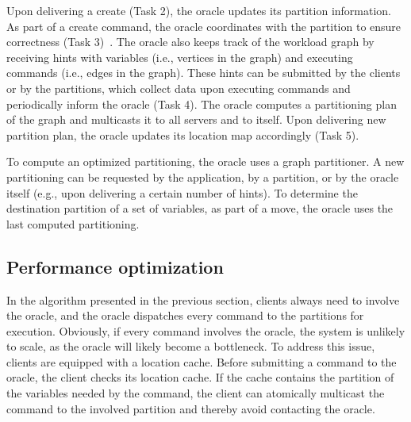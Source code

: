 Upon delivering a create (Task 2), the oracle updates its partition information.
As part of a create command, the oracle coordinates with the partition to ensure correctness (Task 3)~\cite{bezerra2014ssmr}.
%
The oracle also keeps track of the workload graph by receiving hints with variables (i.e., vertices in the graph) and executing commands (i.e., edges in the graph). These hints can be submitted by the clients or by the partitions, which collect data upon executing commands and periodically inform the oracle (Task 4).
The oracle computes a partitioning plan of the graph and multicasts it to all servers and to itself. Upon delivering new partition plan, the oracle updates its location map accordingly (Task 5).

To compute an optimized partitioning, the oracle uses a graph partitioner.
A new partitioning can be requested by the application, by a partition, or by the oracle itself (e.g., upon delivering a certain number of hints).
To determine the destination partition of a set of variables, as part of a move, the oracle uses 
the last computed partitioning.

\subsection{Performance optimization}
\label{sec:optm}

%
In the algorithm presented in the previous section, clients always need to involve the oracle, and the oracle dispatches every command to the partitions for execution.
Obviously, if every command involves the oracle, the system is unlikely to scale, as the oracle will likely become a bottleneck.
To address this issue, clients are equipped with a location cache.
Before submitting a command to the oracle, the client checks its location cache.
If the cache contains the partition of the variables needed by the command, the client can atomically multicast the command to the involved partition and thereby avoid contacting the oracle. 

